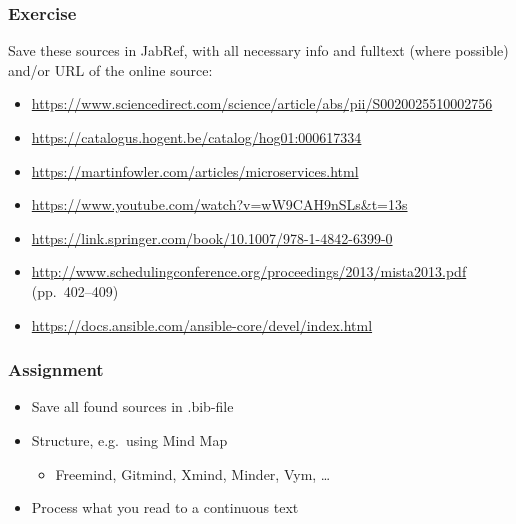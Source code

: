 \documentclass[aspectratio=169]{beamer}
\begin{document}
\begin{frame}[plain]
    \frametitle{Exercise}
    
    Save these sources in JabRef, with all necessary info and fulltext (where possible) and/or URL of the online source:
    
    \bigskip
    
    \begin{itemize}
        \item \url{https://www.sciencedirect.com/science/article/abs/pii/S0020025510002756}
        \item \url{https://catalogus.hogent.be/catalog/hog01:000617334}
        \item \url{https://martinfowler.com/articles/microservices.html}
        \item \url{https://www.youtube.com/watch?v=wW9CAH9nSLs&t=13s}
        \item \url{https://link.springer.com/book/10.1007/978-1-4842-6399-0}
        \item \url{http://www.schedulingconference.org/proceedings/2013/mista2013.pdf} (pp.\ 402--409)
        \item \url{https://docs.ansible.com/ansible-core/devel/index.html}
    \end{itemize}
    
\end{frame}

\begin{frame}
    \frametitle{Assignment}
    
    \begin{itemize}
        \item Save all found sources in .bib-file
        \item Structure, e.g.\ using Mind Map
        \begin{itemize}
            \item Freemind, Gitmind, Xmind, Minder, Vym, \ldots
        \end{itemize}
        \item Process what you read to a continuous text
    \end{itemize}
    
    \bigskip
    
\end{frame}
\end{document}
